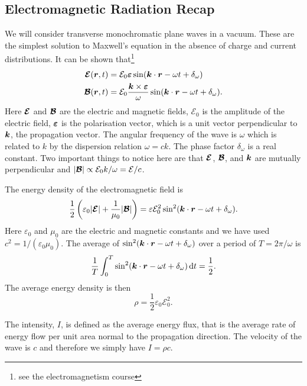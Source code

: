 \documentclass[a4paper]{article}
\newcommand{\Efield}{\mathcal{E}}
\newcommand{\Bfield}{\mathcal{B}}
\begin{document}
    \subsection{Electromagnetic Radiation Recap}
    We will consider transverse monochromatic plane waves in a vacuum.
    These are the simplest solution to Maxwell's equation in the absence of charge and current distributions.
    It can be shown that\footnote{see the electromagnetism course}
    \begin{align*}
        \vv{\Efield}(\vv{r}, t) &= \Efield_0 \vv{\varepsilon}\sin(\vv{k}\cdot\vv{r} - \omega t + \delta_{\omega})\\
        \vv{\Bfield}(\vv{r}, t) &= \Efield_0 \frac{\vv{k}\times\vv{\varepsilon}}{\omega} \sin(\vv{k}\cdot\vv{r} - \omega t + \delta_{\omega}).
    \end{align*}
    Here \(\vv{\Efield}\) and \(\vv{\Bfield}\) are the electric and magnetic fields, \(\Efield_0\) is the amplitude of the electric field, \(\bm{\varepsilon}\) is the polarisation vector, which is a unit vector perpendicular to \(\bm{k}\), the propagation vector.
    The angular frequency of the wave is \(\omega\) which is related to \(k\) by the dispersion relation \(\omega = ck\).
    The phase factor \(\delta_{\omega}\) is a real constant.
    Two important things to notice here are that \(\vv{\Efield}\), \(\vv{\Bfield}\), and \(\bm{k}\) are mutually perpendicular and \(\abs{\vv{\Bfield}} \propto \Efield_0 k/\omega = \Efield/c\).
    
    The energy density of the electromagnetic field is
    \[\frac{1}{2}\left( \varepsilon_{0}\abs{\vv{\Efield}} + \frac{1}{\mu_0}\abs{\vv{\Bfield}} \right) = \varepsilon\Efield_0^2 \sin^2(\vv{k}\cdot\vv{r} - \omega t + \delta_{\omega}).\]
    Here \(\varepsilon_{0}\) and \(\mu_{0}\) are the electric and magnetic constants and we have used \(c^2 = 1/(\varepsilon_0\mu_0)\).
    The average of \(\sin^2(\bm{k}\cdot\bm{r} - \omega t + \delta_{\omega})\) over a period of \(T = 2\pi/\omega\) is
    \[\frac{1}{T}\int_{0}^{T}\sin^2(\bm{k}\cdot\bm{r} - \omega t + \delta_{\omega})\dd{t} = \frac{1}{2}.\]
    The average energy density is then
    \[\rho = \frac{1}{2}\varepsilon_0\Efield_0^2.\]
    
    The intensity, \(I\), is defined as the average energy flux, that is the average rate of energy flow per unit area normal to the propagation direction.
    The velocity of the wave is \(c\) and therefore we simply have \(I = \rho c\).
    
\end{document}
